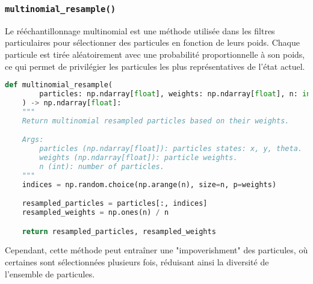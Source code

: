 \documentclass[../CSC_5RO12_TA_TP3.tex]{subfiles}
\begin{document}
\subsubsection{\texttt{multinomial\_resample()}}
\begin{definition}
    Le rééchantillonnage multinomial est une méthode utilisée dans les filtres particulaires pour sélectionner des particules en fonction de leurs poids. Chaque particule est tirée aléatoirement avec une probabilité proportionnelle à son poids, ce qui permet de privilégier les particules les plus représentatives de l'état actuel.

    \begin{scriptsize}\mycode
        \begin{lstlisting}[language=Python, caption=\texttt{multinomial\_resample()}]
def multinomial_resample(
        particles: np.ndarray[float], weights: np.ndarray[float], n: int
    ) -> np.ndarray[float]:
    """
    Return multinomial resampled particles based on their weights.

    Args:
        particles (np.ndarray[float]): particles states: x, y, theta.
        weights (np.ndarray[float]): particle weights.
        n (int): number of particles.
    """
    indices = np.random.choice(np.arange(n), size=n, p=weights)

    resampled_particles = particles[:, indices]
    resampled_weights = np.ones(n) / n

    return resampled_particles, resampled_weights
        \end{lstlisting}
    \end{scriptsize}
    \begin{remark}
        Cependant, cette méthode peut entraîner une "impoverishment" des particules, où certaines sont sélectionnées plusieurs fois, réduisant ainsi la diversité de l'ensemble de particules.
    \end{remark}
\end{definition}
\end{document}
